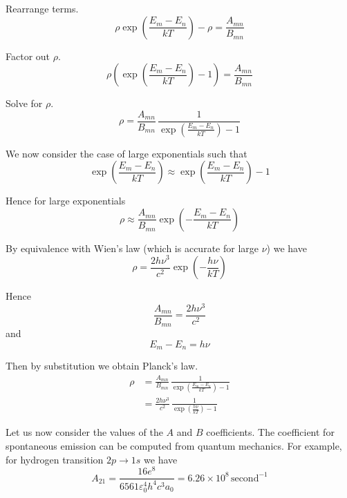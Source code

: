 \documentclass[12pt]{article}
\newcommand\BMN{B_{mn}} %
\newcommand\AMN{A_{mn}} %
\newcommand\RHO{\rho}
\newcommand\ABSORPTION{\substack{\\[1ex] \text{absorption}}}
\newcommand\INDUCED{\substack{\\[1ex] \text{induced}\\ \text{emission}}}
\newcommand\SPONTANEOUS{\substack{\\[1ex] \text{spontaneous}\\ \text{emission}}}
\begin{document}
\noindent
Rearrange terms.
\begin{equation*}
\RHO\exp\left(\frac{E_m-E_n}{kT}\right)
-\RHO=\frac{\AMN}{\BMN}
\end{equation*}

\noindent
Factor out $\RHO$.
\begin{equation*}
\RHO\left(\exp\left(\frac{E_m-E_n}{kT}\right)-1\right)
=\frac{\AMN}{\BMN}
\end{equation*}

\noindent
Solve for $\RHO$.
\begin{equation*}
\RHO
=\frac{\AMN}{\BMN}\,\frac{1}{\exp\left(\frac{E_m-E_n}{kT}\right)-1}
\end{equation*}

\noindent
We now consider the case of large exponentials such that
\begin{equation*}
\exp\left(\frac{E_m-E_n}{kT}\right)\approx\exp\left(\frac{E_m-E_n}{kT}\right)-1
\end{equation*}

Hence for large exponentials
\begin{equation*}
\RHO\approx
\frac{\AMN}{\BMN}\exp\left(-\frac{E_m-E_n}{kT}\right)
\end{equation*}

\noindent
By equivalence with Wien's law (which is accurate for large $\nu$) we have
\begin{equation*}
\RHO=\frac{2h\nu^3}{c^2}\exp\left(-\frac{h\nu}{kT}\right)
\end{equation*}

Hence
\begin{equation*}
\frac{\AMN}{\BMN}=\frac{2h\nu^3}{c^2}
\tag{4}
\end{equation*}
and
\begin{equation*}
E_m-E_n=h\nu
\end{equation*}

\noindent
Then by substitution we obtain Planck's law.
\begin{align*}
\RHO
&=\frac{\AMN}{\BMN}\,\frac{1}{\exp\left(\frac{E_m-E_n}{kT}\right)-1}
\\[1.5ex]
&=\frac{2h\nu^3}{c^2}\,\frac{1}{\exp\left(\frac{h\nu}{kT}\right)-1}
\end{align*}


\noindent
Let us now consider the values of the $A$ and $B$ coefficients.
The coefficient for spontaneous emission can be computed from quantum mechanics.
For example, for hydrogen transition $2p\rightarrow1s$ we have
\begin{equation*}
A_{21}=\frac{16e^8}{6561\varepsilon_0^4h^4c^3a_0}
=6.26\times10^8\,\text{second}^{-1}
\end{equation*}
\end{document}
